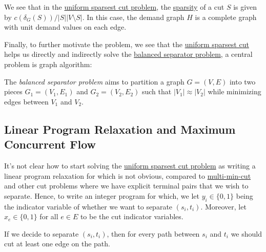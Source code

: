 We see that in the \hyperref[prb:sparsest-cut]{uniform sparsest cut problem}, the \hyperref[def:sparsity]{sparsity} of a cut \(S\) is given by \(c(\delta _G(S)) / \lvert S \rvert \lvert V \setminus S \rvert \). In this case, the demand graph \(H\) is a complete graph with unit demand values on each edge.

Finally, to further motivate the problem, we see that the \hyperref[prb:sparsest-cut]{uniform sparsest cut} helps us directly and indirectly solve the \hyperref[prb:balanced-separator]{balanced separator problem}, a central problem is graph algorithm:

\begin{problem}\label{prb:balanced-separator}
The \emph{balanced separator problem} aims to partition a graph \(G = (V, E)\) into two pieces \(G_1 = (V_1, E_1)\) and \(G_2 = (V_2, E_2)\) such that \(\lvert V_1 \rvert \approx \lvert V_2 \rvert \) while minimizing edges between \(V_1\) and \(V_2\).
\end{problem}

\subsection{Linear Program Relaxation and Maximum Concurrent Flow}
It's not clear how to start solving the \hyperref[prb:sparsest-cut]{uniform sparsest cut problem} as writing a linear program relaxation for which is not obvious, compared to \hyperref[prb:multi-min-cut]{multi-min-cut} and other cut problems where we have explicit terminal pairs that we wish to separate. Hence, to write an integer program for which, we let \(y_i \in \{ 0, 1 \} \) being the indicator variable of whether we want to separate \((s_i, t_i)\). Moreover, let \(x_e \in \{ 0, 1 \} \) for all \(e \in E\) to be the cut indicator variables.

\begin{intuition}
	If we decide to separate \((s_i, t_i)\), then for every path between \(s_i\) and \(t_i\) we should cut at least one edge on the path.
\end{intuition}

